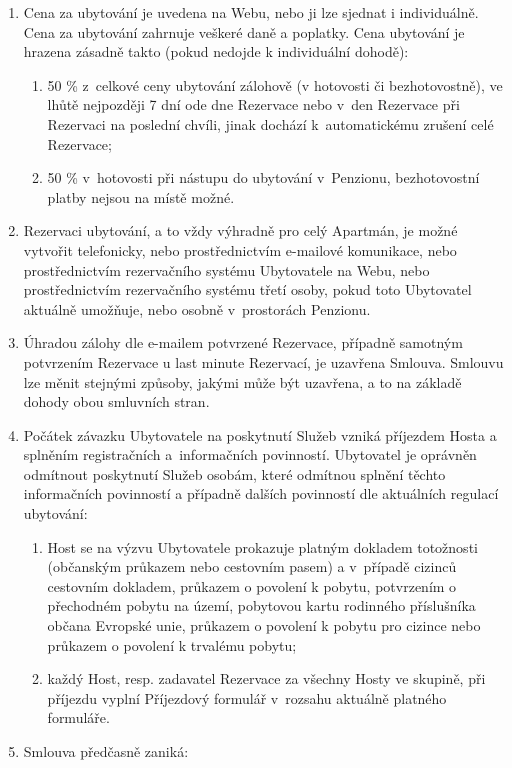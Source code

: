 \documentclass[a4paper]{scrartcl}
\begin{document}
\begin{enumerate}

  \item
        Cena za ubytování je uvedena na Webu, nebo ji lze sjednat i
        individuálně. Cena za ubytování zahrnuje veškeré daně a poplatky.
        Cena ubytování je hrazena zásadně takto (pokud nedojde k
        individuální dohodě):

        \begin{enumerate}

          \item
                50 \% z~celkové ceny ubytování zálohově (v hotovosti či
                bezhotovostně), ve lhůtě nejpozději 7 dní ode dne Rezervace nebo
                v~den Rezervace při Rezervaci na poslední chvíli, jinak dochází
                k~automatickému zrušení celé Rezervace;
          \item
                50 \% v~hotovosti při nástupu do ubytování v~Penzionu,
                bezhotovostní platby nejsou na místě možné.
        \end{enumerate}
  \item
        Rezervaci ubytování, a to vždy výhradně pro celý Apartmán, je možné
        vytvořit telefonicky, nebo prostřednictvím e-mailové komunikace,
        nebo prostřednictvím rezervačního systému Ubytovatele na Webu, nebo
        prostřednictvím rezervačního systému třetí osoby, pokud toto
        Ubytovatel aktuálně umožňuje, nebo osobně v~prostorách Penzionu.
  \item
        Úhradou zálohy dle e-mailem potvrzené Rezervace, případně samotným
        potvrzením Rezervace u last minute Rezervací, je uzavřena Smlouva.
        Smlouvu lze měnit stejnými způsoby, jakými může být uzavřena, a to
        na základě dohody obou smluvních stran.
  \item
        Počátek závazku Ubytovatele na poskytnutí Služeb vzniká příjezdem
        Hosta a splněním registračních a~informačních povinností. Ubytovatel
        je oprávněn odmítnout poskytnutí Služeb osobám, které odmítnou
        splnění těchto informačních povinností a případně dalších povinností
        dle aktuálních regulací ubytování:

        \begin{enumerate}

          \item
                Host se na výzvu Ubytovatele prokazuje platným dokladem totožnosti
                (občanským průkazem nebo cestovním pasem) a v~případě cizinců
                cestovním dokladem, průkazem o povolení k pobytu, potvrzením o
                přechodném pobytu na území, pobytovou kartu rodinného příslušníka
                občana Evropské unie, průkazem o povolení k pobytu pro cizince
                nebo průkazem o povolení k trvalému pobytu;
          \item
                každý Host, resp. zadavatel Rezervace za všechny Hosty ve skupině,
                při příjezdu vyplní Příjezdový formulář v~rozsahu aktuálně
                platného formuláře.
        \end{enumerate}
  \item
        Smlouva předčasně zaniká:


\end{enumerate}
\end{document}
